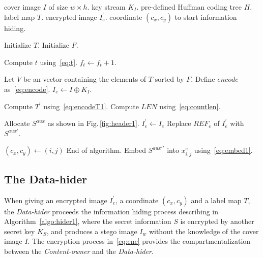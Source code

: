 \begin{algorithm}
	\caption{Generate an encrypted image.}
	\label{algo:embed1}
	
	\begin{algorithmic}[1]
		\Require cover image $I$ of size $w \times h$.
		\Require key stream $K_I$.
		\Require pre-defined Huffman coding tree $H$.
		\Ensure label map $T$.
		\Ensure encrypted image $I_e^\prime$.
		\Ensure coordinate $(c_x, c_y)$ to start information hiding.
		
		\State Initialize $T$.
		\State Initialize $F$.
		
		
		\State		Compute $t$ using~\eqref{eq:t}.
		\State		$f_t \gets f_t + 1$.
		\EndFor
		
		\State Let $V$ be an vector containing the elements of $T$ sorted by $F$.
		\State Define $encode$ as~\eqref{eq:encode}.
		\State $I_e \gets I \oplus K_I$.
		
		\State Compute $T^\prime $ using~\eqref{eq:encodeT1}.
		\State Compute $LEN$ using~\eqref{eq:countlen}.
		
		
		\State Allocate $S^{aux}$ as shown in Fig.\,\ref{fig:header1}.
		\State $I_e^\prime \gets I_e$
		\State Replace $REF_e$ of $I_e^\prime$ with $S^{aux\prime}$.
		
		\State			$(c_x, c_y) \gets (i, j)$
		\State			End of algorithm.
		\Else
		\State			Embed $S^{aux\prime\prime}$ into $x^e_{i, j}$ using~\eqref{eq:embed1}.
		\EndIf
		\EndFor
	\end{algorithmic}
\end{algorithm}

\subsection{The Data-hider}

When giving an encrypted image $I_e^\prime$, a coordinate $(c_x, c_y)$ and a label map $T$, 
the \emph{Data-hider} proceeds the information hiding process describing in Algorithm~\ref{algo:hider1}, 
where the secret information $S$ is encrypted by another secret key $K_S$, 
and produces a stego image $I_w$ 
without the knowledge of the cover image $I$.
The encryption process in~\eqref{eq:enc} provides the compartmentalization between the \emph{Content-owner} and the \emph{Data-hider}.

